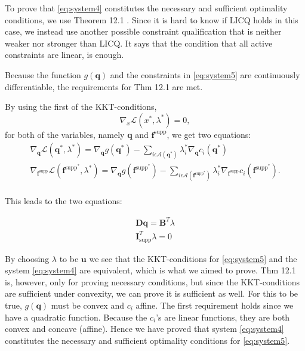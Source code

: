 To prove that \eqref{eq:system4} constitutes the necessary and sufficient optimality conditions, we use Theorem 12.1 \cite{NW}. Since it is hard to know if LICQ holds in this case, we instead use another possible constraint qualification that is neither weaker nor stronger than LICQ. It says that the condition that all active constraints are linear, is enough. 

Because the function $g(\bm{q})$ and the constraints in \eqref{eq:system5} are continuously differentiable, the requirements for Thm 12.1 are met.

By using the first of the KKT-conditions,
\begin{equation}
\nabla_{x}\mathcal{L}(x^{\ast},\lambda^{\ast}) = 0,
\end{equation}
for both of the variables, namely $\bm{q}$ and $\bm{f}^{\textrm{supp}}$, we get two equations:
\begin{equation}
\begin{aligned}
\nabla_{\bm{q}}\mathcal{L}(\bm{q}^{\ast},\lambda^{\ast}) = \nabla_{\bm{q}}g(\bm{q^{\ast}}) - \sum_{i\epsilon\mathcal{A}(\bm{q}^{\ast})}\lambda_{i}^{\ast}\nabla_{\bm{q}}c_{i}(\bm{q}^{\ast}) \\
\nabla_{\bm{f}^{\textrm{supp}}}\mathcal{L}(\bm{f}^{\textrm{supp}^{\ast}}, \lambda^{\ast}) = \nabla_{\bm{q}}g(\bm{f}^{\textrm{supp}^{\ast}}) - \sum_{i\epsilon\mathcal{A}(\bm{f}^{\textrm{supp}^{\ast}})}\lambda_{i}^{\ast}\nabla_{\bm{f}^{\textrm{supp}}}c_{i}(\bm{f}^{\textrm{supp}^{\ast}}).\\
\end{aligned}
\end{equation}

This leads to the two equations:

\begin{equation}
\begin{aligned}
\bm{Dq} = \bm{B}^{T}\lambda\\
\bm{I}^{T}_{\textrm{supp}}\lambda = 0
\end{aligned}
\end{equation}

By choosing $\lambda$ to be $\bm{u}$ we see that the KKT-conditions for \eqref{eq:system5} and the system \eqref{eq:system4} are equivalent, which is what we aimed to prove. Thm 12.1 is, however, only for proving necessary conditions, but since the KKT-conditions are sufficient under convexity, we can prove it is sufficient as well. For this to be true, $g(\bm{q})$ must be convex and $c_{i}$ affine. The first requirement holds since we have a quadratic function. Because the $c_{i}$'s are linear functions, they are both convex and concave (affine). Hence we have proved that system \eqref{eq:system4} constitutes the necessary and sufficient optimality conditions for \eqref{eq:system5}.